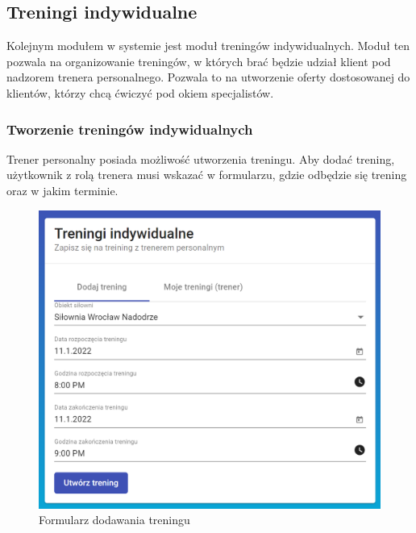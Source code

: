 \documentclass[a4paper,twoside,12pt]{book}
\begin{document}
\subsection{Treningi indywidualne}
Kolejnym modułem w systemie jest moduł treningów indywidualnych. Moduł ten pozwala na organizowanie treningów, w których brać będzie udział klient pod nadzorem trenera personalnego. Pozwala to na utworzenie oferty dostosowanej do klientów, którzy chcą ćwiczyć pod okiem specjalistów.
\FloatBarrier

\newpage
\subsubsection{Tworzenie treningów indywidualnych}
Trener personalny posiada możliwość utworzenia treningu. Aby dodać trening, użytkownik z rolą trenera musi wskazać w formularzu, gdzie odbędzie się trening oraz w jakim terminie.
\begin{figure}[h!]
	\centering
	\includegraphics[width=1\linewidth]{../zrzuty_ekranu/dzialanie/treningi/dodawanie_treningu}
	\caption{Formularz dodawania treningu}
	\label{fig:dodawanietreningu}
\end{figure}
\FloatBarrier
\end{document}

